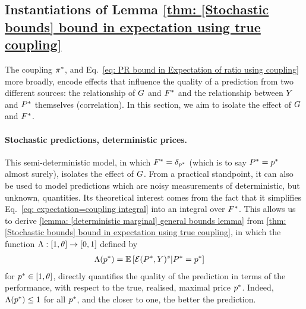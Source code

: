 

\subsection{Instantiations of Lemma \ref{thm: [Stochastic bounds] bound in expectation using true coupling}}\label{subsec: instances}


The coupling $\pi^*$, and Eq.~\eqref{eq: PR bound in Expectation of ratio using coupling} more broadly, encode effects that influence the quality of a prediction from two different sources: the relationship of $G$ and $F^*$ and the relationship between $Y$ and $P^*$ themselves (\eg correlation). In this section, we aim to isolate the effect of $G$ and $F^*$.

\paragraph{Stochastic predictions, deterministic prices.}
This semi-deterministic model, in which $F^*=\delta_{p^*}$ (which is to say $P^*=p^*$ almost surely), isolates the effect of $G$. From a practical standpoint, it can also be used to model predictions which are noisy measurements of deterministic, but unknown, quantities.
%
Its theoretical interest comes from the fact that it simplifies Eq.~\eqref{eq: expectation=coupling integral} into an integral over $F^*$. This allows us to derive \cref{lemma: [deterministic marginal] general bounds lemma} from \cref{thm: [Stochastic bounds] bound in expectation using true coupling}, in which the function $\Lambda:[1,\theta]\to[0,1]$ defined by 
\begin{align}
\Lambda(p^*)&= \mathbb{E}\left[\mathcal{E}(P^*,Y)^{s}\vert P^*=p^*\right] \,
\label{eq: [deterministic marginal] detpredfun definition}
\end{align}
for $p^*\in[1,\theta]$, directly quantifies the quality of the prediction in terms of the performance, with respect to the true, realised, maximal price $p^*$. Indeed, $\Lambda(p^*) \leq 1$ for all $p^*$, and the closer to one, the better the prediction.

